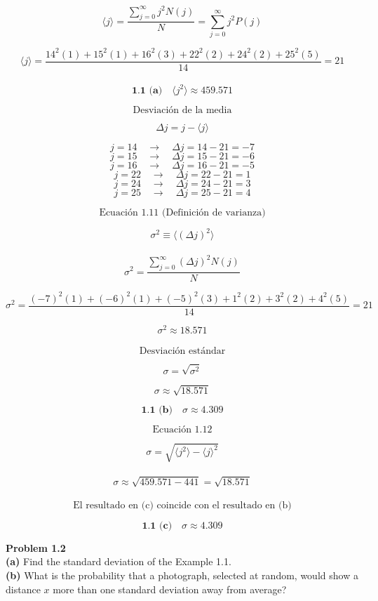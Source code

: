 \documentclass[10pt,a4papper]{article}
\begin{document}
\[\langle j\rangle=\frac{\sum_{j=0}^\infty j^2N(j)}{N}=\sum_{j=0}^\infty j^2P(j)\]

\[\langle j\rangle=\frac{14^2(1)+15^2(1)+16^2(3)+22^2(2)+24^2(2)+25^2(5)}{14}=21\]\\

\[\boxed{\textbf{1.1 (a)}\quad\langle j^2\rangle\approx 459.571}\]

\newpage
\[\text{Desviación de la media}\]

\[\Delta j=j-\langle j\rangle\]

\[j=14\quad\to\quad\Delta j=14-21=-7\]
\[j=15\quad\to\quad\Delta j=15-21=-6\]
\[j=16\quad\to\quad\Delta j=16-21=-5\]
\[j=22\quad\to\quad\Delta j=22-21=1\]
\[j=24\quad\to\quad\Delta j=24-21=3\]
\[j=25\quad\to\quad\Delta j=25-21=4\]

\[\text{Ecuación 1.11 (Definición de varianza)}\]

\[\sigma^2\equiv\langle(\Delta j)^2\rangle\]\\

\[\sigma^2=\frac{\sum_{j=0}^\infty(\Delta j)^2N(j)}{N}\]

\[\sigma^2=\frac{(-7)^2(1)+(-6)^2(1)+(-5)^2(3)+1^2(2)+3^2(2)+4^2(5)}{14}=21\]

\[\boxed{\sigma^2\approx 18.571}\]\\

\[\text{Desviación estándar}\]

\[\sigma=\sqrt{\sigma^2}\]

\[\sigma\approx\sqrt{18.571}\]

\[\boxed{\textbf{1.1 (b)}\quad\sigma\approx 4.309}\]

\newpage
\[\text{Ecuación 1.12}\]

\[\sigma=\sqrt{\langle j^2\rangle-\langle j\rangle^2}\]\\

\[\sigma\approx\sqrt{459.571-441}=\sqrt{18.571}\]\\

\[\text{El resultado en (c) coincide con el resultado en (b)}\]

\[\boxed{\textbf{1.1 (c)}\quad\sigma\approx 4.309}\]

\newpage
\textbf{Problem 1.2}\\

\textbf{(a)} Find the standard deviation of the Example 1.1.\\
\textbf{(b)} What is the probability that a photograph, selected at random, would
show a distance $x$ more than one standard deviation away from average?
\end{document}
